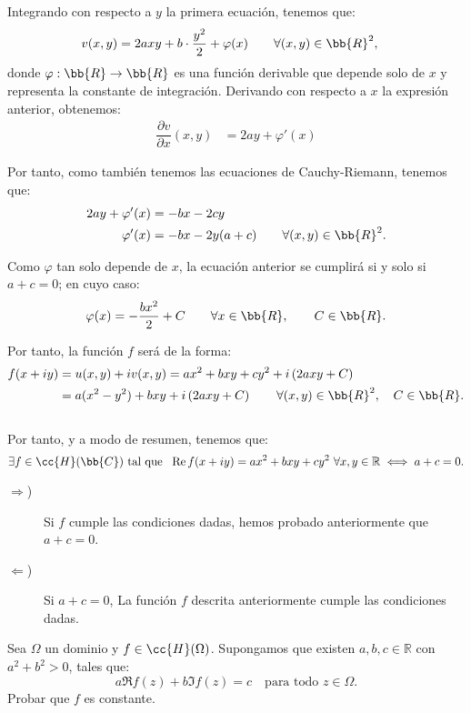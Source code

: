 \begin{ejercicio}
    Integrando con respecto a $y$ la primera ecuación, tenemos que:
    \begin{align*}
        v(x,y) &= 2ax y + b\cdot \dfrac{y^2}{2} + \varphi(x)\qquad \forall (x,y)\in\bb{R}^2,
    \end{align*}
    donde $\varphi:\bb{R}\to\bb{R}$ es una función derivable que depende solo de $x$ y representa la constante de integración. Derivando con respecto a $x$ la expresión anterior, obtenemos:
    \begin{align*}
        \dfrac{\partial v}{\partial x}(x,y) &= 2ay + \varphi'(x)
    \end{align*}

    Por tanto, como también tenemos las ecuaciones de Cauchy-Riemann, tenemos que:
    \begin{align*}
        2ay + \varphi'(x) &= -bx - 2cy\\
        \varphi'(x) &= -bx - 2y(a+c)\qquad \forall (x,y)\in\bb{R}^2.
    \end{align*}

    Como $\varphi$ tan solo depende de $x$, la ecuación anterior se cumplirá si y solo si $a+c=0$; en cuyo caso:
    \[
        \varphi(x) = -\dfrac{bx^2}{2} + C\qquad \forall x\in\bb{R},\qquad C\in\bb{R}.
    \]

    Por tanto, la función $f$ será de la forma:
    \begin{align*}
        f(x+iy) &= u(x,y) + iv(x,y) = ax^2 + bxy + cy^2 + i\left(2axy + C\right)\\
        &= a(x^2-y^2) + bxy + i\left(2axy + C\right)\qquad \forall (x,y)\in\bb{R}^2,\quad C\in\bb{R}.
    \end{align*}~\\

    Por tanto, y a modo de resumen, tenemos que:
    \[
        \exists f \in \cc{H}(\bb{C}) \ \text{tal que }\ \Re f(x + iy) = ax^2 + bxy + cy^2 \ \forall x, y \in \mathbb{R} \iff a+c=0.
    \]
    \begin{description}
        \item[$\Rightarrow$)] Si $f$ cumple las condiciones dadas, hemos probado anteriormente que $a+c=0$.
        \item[$\Leftarrow$)] Si $a+c=0$, La función $f$ descrita anteriormente cumple las condiciones dadas.
    \end{description}

\end{ejercicio}

\begin{ejercicio}
    Sea $\Omega$ un dominio y $f \in \cc{H}(\Omega)$. Supongamos que existen $a, b, c \in \mathbb{R}$ con $a^2 + b^2 > 0$, tales que:
    \[
        a\Re f(z) + b\Im f(z) = c \quad \text{para todo } z \in \Omega.
    \]
    Probar que $f$ es constante.
\end{ejercicio}

